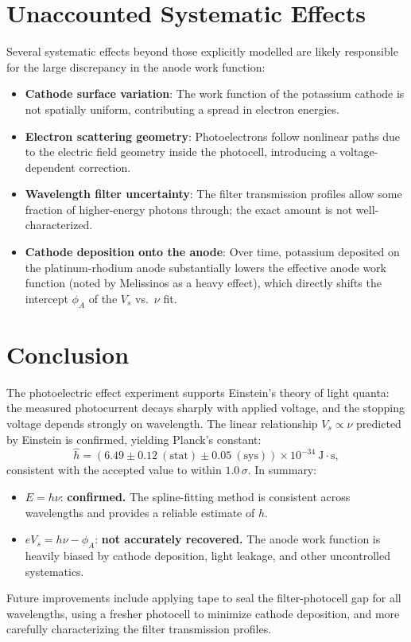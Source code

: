 \documentclass[12pt]{article}
\begin{document}
\section{Unaccounted Systematic Effects}

Several systematic effects beyond those explicitly modelled are likely responsible for the large discrepancy in the anode work function:

\begin{itemize}
    \item \textbf{Cathode surface variation}: The work function of the potassium cathode is not spatially uniform, contributing a spread in electron energies.
    \item \textbf{Electron scattering geometry}: Photoelectrons follow nonlinear paths due to the electric field geometry inside the photocell, introducing a voltage-dependent correction.
    \item \textbf{Wavelength filter uncertainty}: The filter transmission profiles allow some fraction of higher-energy photons through; the exact amount is not well-characterized.
    \item \textbf{Cathode deposition onto the anode}: Over time, potassium deposited on the platinum-rhodium anode substantially lowers the effective anode work function (noted by Melissinos as a heavy effect), which directly shifts the intercept $\phi_A$ of the $V_s$ vs.\ $\nu$ fit.
\end{itemize}

\section{Conclusion}

The photoelectric effect experiment supports Einstein's theory of light quanta: the measured photocurrent decays sharply with applied voltage, and the stopping voltage depends strongly on wavelength. The linear relationship $V_s \propto \nu$ predicted by Einstein is confirmed, yielding Planck's constant:
\begin{equation}
    \hat{h} = (6.49 \pm 0.12\ (\text{stat}) \pm 0.05\ (\text{sys})) \times 10^{-34}\ \text{J}\cdot\text{s},
\end{equation}
consistent with the accepted value to within $1.0\,\sigma$. In summary:
\begin{itemize}
    \item $E = h\nu$: \textbf{confirmed.} The spline-fitting method is consistent across wavelengths and provides a reliable estimate of $h$.
    \item $eV_s = h\nu - \phi_A$: \textbf{not accurately recovered.} The anode work function is heavily biased by cathode deposition, light leakage, and other uncontrolled systematics.
\end{itemize}
Future improvements include applying tape to seal the filter-photocell gap for all wavelengths, using a fresher photocell to minimize cathode deposition, and more carefully characterizing the filter transmission profiles.
\end{document}
